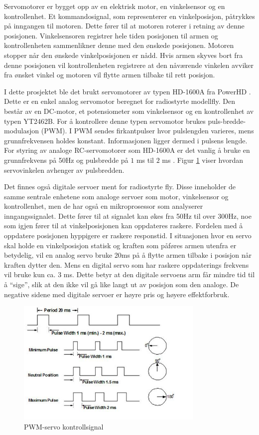 Servomotorer er bygget opp av en elektrisk motor, en vinkelsensor og en kontrollenhet. Et kommandosignal, som representerer en vinkelposisjon, påtrykkes på inngangen til motoren. Dette fører til at motoren roterer i retning av denne posisjonen. Vinkelsensoren registrer hele tiden posisjonen til armen og kontrollenheten sammenlikner denne med den ønskede posisjonen. Motoren stopper når den ønskede vinkelposisjonen er nådd. Hvis armen skyves bort fra denne posisjonen vil kontrollenheten registrere at den nåværende vinkelen avviker fra ønsket vinkel og motoren vil flytte armen tilbake til rett posisjon. 

I dette prosjektet ble det brukt servomotorer av typen HD-1600A fra PowerHD \cite{PowerHD}. Dette er en enkel analog servomotor beregnet for radiostyrte modellfly. Den består av en DC-motor, et potensiometer som vinkelsensor og en kontrollenhet av typen YT2462B. For å kontrollere denne typen servomotor brukes puls-bredde-modulasjon (PWM). I PWM sendes firkantpulser hvor pulslengden varieres, mens grunnfrekvensen holdes konstant. Informasjonen ligger dermed i pulsens lengde. For styring av analoge RC-servomotorer som HD-1600A er det vanlig å bruke en grunnfrekvens på 50Hz og pulsbredde på $1$ ms til $2$ ms \cite{PCBheaven}. Figur \ref{fig:PWM} viser hvordan servovinkelen avhenger av pulsbredden.

Det finnes også digitale servoer ment for radiostyrte fly. Disse inneholder de samme sentrale enhetene som analoge servoer som motor, vinkelsensor og kontrollenhet, men de har også en mikroprosessor som analyserer inngangssignalet. Dette fører til at signalet kan økes fra 50Hz til over 300Hz, noe som igjen fører til at vinkelposisjonen kan oppdateres raskere. Fordelen med å oppdatere posisjonen hyppigere er raskere responstid. I situasjonen hvor en servo skal holde en vinkelposisjon statisk og kraften som påføres armen utenfra er betydelig, vil en analog servo bruke 20ms på å flytte armen tilbake i posisjon når kraften dytter den. Mens en digital servo som har raskere oppdaterings frekvens vil bruke kun ca. $3$ ms. Dette betyr at den digitale servoens arm får mindre tid til å ``sige'', slik at den ikke vil gå like langt ut av posisjon som den analoge. De negative sidene med digitale servoer er høyre pris og høyere effektforbruk.    

\begin{figure}[H]
\centering
\includegraphics[width=0.8\textwidth]{img/pwm_servo.jpg}
\caption{PWM-servo kontrollsignal \cite{PWM}}
\label{fig:PWM}
\end{figure}   

